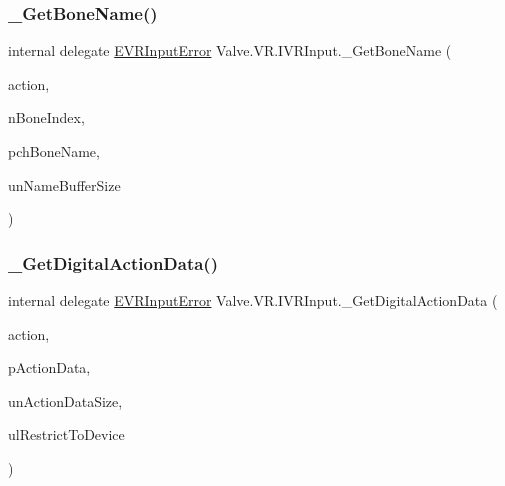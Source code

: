 \mbox{\label{struct_valve_1_1_v_r_1_1_i_v_r_input_ab946688fdae1876df1fa3c06426579cf}} 
\subsubsection{\texorpdfstring{\_GetBoneName()}{\_GetBoneName()}}
{\footnotesize\ttfamily internal delegate \mbox{\hyperlink{namespace_valve_1_1_v_r_a592d7f4189b8346d6c96dbdbaa35bc1b}{E\+V\+R\+Input\+Error}} Valve.\+V\+R.\+I\+V\+R\+Input.\+\_\+\+Get\+Bone\+Name (\begin{DoxyParamCaption}\item[{ulong}]{action,  }\item[{int}]{n\+Bone\+Index,  }\item[{System.\+Text.\+String\+Builder}]{pch\+Bone\+Name,  }\item[{uint}]{un\+Name\+Buffer\+Size }\end{DoxyParamCaption})}

\mbox{\label{struct_valve_1_1_v_r_1_1_i_v_r_input_a376552d06df56ac9589e5014e3f04908}} 
\subsubsection{\texorpdfstring{\_GetDigitalActionData()}{\_GetDigitalActionData()}}
{\footnotesize\ttfamily internal delegate \mbox{\hyperlink{namespace_valve_1_1_v_r_a592d7f4189b8346d6c96dbdbaa35bc1b}{E\+V\+R\+Input\+Error}} Valve.\+V\+R.\+I\+V\+R\+Input.\+\_\+\+Get\+Digital\+Action\+Data (\begin{DoxyParamCaption}\item[{ulong}]{action,  }\item[{ref \mbox{\hyperlink{struct_valve_1_1_v_r_1_1_input_digital_action_data__t}{Input\+Digital\+Action\+Data\+\_\+t}}}]{p\+Action\+Data,  }\item[{uint}]{un\+Action\+Data\+Size,  }\item[{ulong}]{ul\+Restrict\+To\+Device }\end{DoxyParamCaption})}

